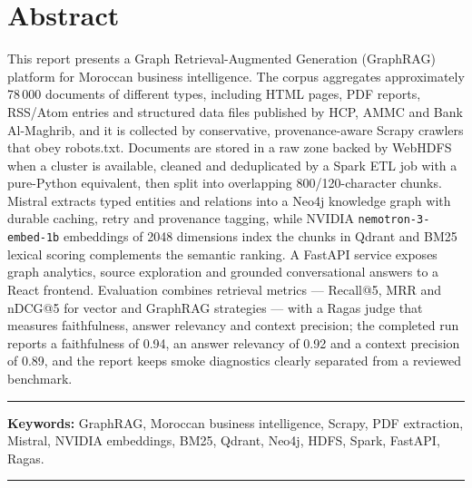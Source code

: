\chapter*{Abstract}
\begingroup{}
This report presents a Graph Retrieval-Augmented Generation (GraphRAG) platform for Moroccan business intelligence. The corpus aggregates approximately 78\,000 documents of different types, including HTML pages, PDF reports, RSS/Atom entries and structured data files published by HCP, AMMC and Bank Al-Maghrib, and it is collected by conservative, provenance-aware Scrapy crawlers that obey robots.txt. Documents are stored in a raw zone backed by WebHDFS when a cluster is available, cleaned and deduplicated by a Spark ETL job with a pure-Python equivalent, then split into overlapping 800/120-character chunks. Mistral extracts typed entities and relations into a Neo4j knowledge graph with durable caching, retry and provenance tagging, while NVIDIA \texttt{nemotron-3-embed-1b} embeddings of 2048 dimensions index the chunks in Qdrant and BM25 lexical scoring complements the semantic ranking. A FastAPI service exposes graph analytics, source exploration and grounded conversational answers to a React frontend. Evaluation combines retrieval metrics --- Recall@5, MRR and nDCG@5 for vector and GraphRAG strategies --- with a Ragas judge that measures faithfulness, answer relevancy and context precision; the completed run reports a faithfulness of 0.94, an answer relevancy of 0.92 and a context precision of 0.89, and the report keeps smoke diagnostics clearly separated from a reviewed benchmark.
\par\medskip
\noindent\rule{\textwidth}{0.5pt}\par\smallskip
{\textbf{Keywords:}} GraphRAG, Moroccan business intelligence, Scrapy, PDF extraction, Mistral, NVIDIA embeddings, BM25, Qdrant, Neo4j, HDFS, Spark, FastAPI, Ragas.\par\smallskip
\noindent\rule{\textwidth}{0.5pt}
\endgroup
